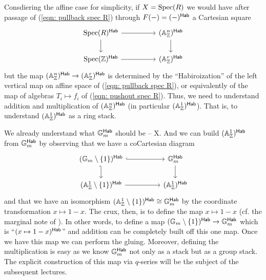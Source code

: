 \begin{remark}
    Consdiering the affine case for simplicity, if $X=\operatorname{Spec}(R)$ we would have after passage of (\ref{eqn: pullback spec R}) through $F(-)=(-)^{\mathsf{Hab}}$ a Cartesian square
    $$%
    \begin{tikzcd}
        {\spec(R)^{\Hab}} && {(\A^{n}_{\ZZ})^{\Hab}} \\
        {\spec(\ZZ)^{\Hab}} && {(\A^{r}_{\ZZ})^{\Hab}}
        \arrow[from=1-1, to=1-3]
        \arrow[from=1-1, to=2-1]
        \arrow[from=1-3, to=2-3]
        \arrow[from=2-1, to=2-3]
    \end{tikzcd}$$
    but the map $(\mathbb{A}^{n}_{\mathbb{Z}})^{\mathsf{Hab}}\to(\mathbb{A}^{r}_{\mathbb{Z}})^{\mathsf{Hab}}$ is determined by the ``Habiroization'' of the left vertical map on affine space of (\ref{eqn: pullback spec R}), or equivalently of the map of algebras $T_{i}\mapsto f_{i}$ of (\ref{eqn: pushout spec R}). Thus, we need to understand addition and multiplication of $(\mathbb{A}^{n}_{\mathbb{Z}})^{\mathsf{Hab}}$ (in particular $(\mathbb{A}^{1}_{\mathbb{Z}})^{\mathsf{Hab}}$). That is, to understand $(\mathbb{A}^{1}_{\mathbb{Z}})^{\mathsf{Hab}}$ as a ring stack. 
\end{remark}
We already understand what $\mathbb{G}_{m}^{\mathsf{Hab}}$ should be -- X. And we can build $(\mathbb{A}^{1}_{\mathbb{Z}})^{\mathsf{Hab}}$ from $\mathbb{G}_{m}^{\mathsf{Hab}}$ by observing that we have a coCartesian diagram 
$$%
\begin{tikzcd}
	{(\GG_{m}\setminus\{1\})^{\Hab}} && {\GG_{m}^{\Hab}} \\
	{(\A^{1}_{\ZZ}\setminus\{1\})^{\Hab}} && {(\A^{1}_{\ZZ})^{\Hab}}
	\arrow[hook, from=1-1, to=1-3]
	\arrow[hook', from=1-1, to=2-1]
	\arrow[from=1-3, to=2-3]
	\arrow[from=2-1, to=2-3]
\end{tikzcd}$$
and that we have an isomorphism $(\mathbb{A}^{1}_{\mathbb{Z}}\setminus\{1\})^{\mathsf{Hab}}\cong\mathbb{G}_{m}^{\mathsf{Hab}}$ by the coordinate transformation $x\mapsto 1-x$. The crux, then, is to define the map $x\mapsto 1-x$ (cf. the marginal note of ). In other words, to define a map $(\mathbb{G}_{m}\setminus\{1\})^{\mathsf{Hab}}\to \mathbb{G}_{m}^{\mathsf{Hab}}$ which is ``$(x\mapsto 1-x)^{\mathsf{Hab}}$'' and addition can be completely built off this one map. Once we have this map we can perform the gluing. Moreover, defining the multiplication is easy as we know $\mathbb{G}_{m}^{\mathsf{Hab}}$ not only as a stack but as a group stack. The explicit construction of this map via $q$-series will be the subject of the subsequent lectures. 
